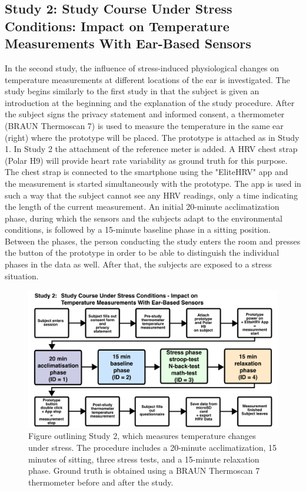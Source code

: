 \subsection{Study 2: Study Course Under Stress Conditions: Impact on Temperature Measurements With Ear-Based Sensors}
\label{ch:Design:Study:Study2}
In the second study, the influence of stress-induced physiological changes on temperature measurements at different locations of the ear is investigated. 
The study begins similarly to the first study in that the subject is given an introduction at the beginning and the explanation of the study procedure.
After the subject signs the privacy statement and informed consent, a thermometer (BRAUN Thermoscan 7) is used to measure the temperature in the same ear (right) where the prototype will be placed.
The prototype is attached as in Study 1.
In Study 2 the attachment of the reference meter is added.
A HRV chest strap (Polar H9) will provide heart rate variability as ground truth for this purpose.
The chest strap is connected to the smartphone using the "EliteHRV" app and the measurement is started simultaneously with the prototype.
The app is used in such a way that the subject cannot see any HRV readings, only a time indicating the length of the current measurement.
An initial 20-minute acclimatization phase, during which the sensors and the subjects adapt to the environmental conditions, is followed by a 15-minute baseline phase in a sitting position.
Between the phases, the person conducting the study enters the room and presses the button of the prototype in order to be able to distinguish the individual phases in the data as well.
After that, the subjects are exposed to a stress situation. 
\begin{figure}[!t]
    \centering
    \includegraphics[width=\textwidth]{thesis-doc/images/study2/Procedure2.pdf}
    \caption{Figure outlining Study 2, which measures temperature changes under stress. The procedure includes a 20-minute acclimatization, 15 minutes of sitting, three stress tests, and a 15-minute relaxation phase. Ground truth is obtained using a BRAUN Thermoscan 7 thermometer before and after the study.}
    \label{fig:design:study2:procedure}
\end{figure}
